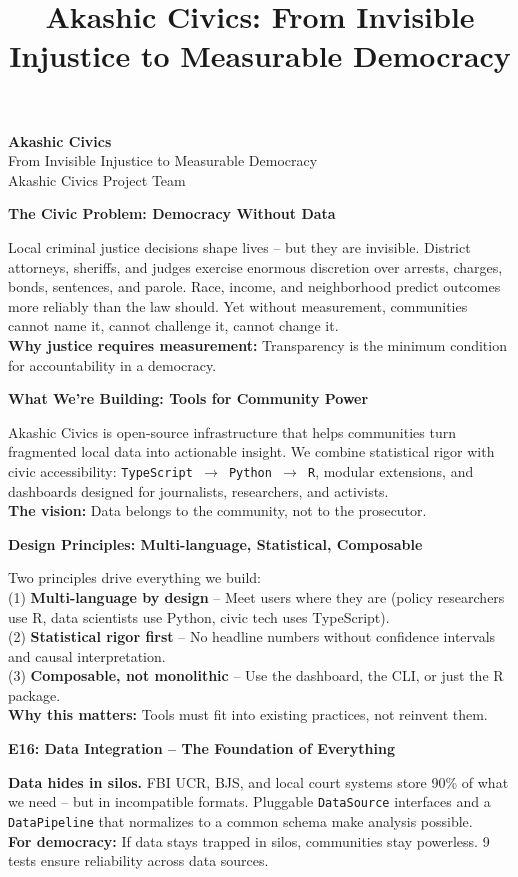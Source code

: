 \documentclass[11pt]{article}
\title{\Huge\textbf{Akashic Civics: From Invisible Injustice to Measurable Democracy}}
\date{}
\newcommand{\slide}[1]{\vspace{0.4em}\noindent\textbf{#1}\vspace{0.2em}}
\begin{document}
\begin{center} \Huge\textbf{Akashic Civics}\\[0.2em]
\LARGE{From Invisible Injustice to Measurable Democracy}\\[0.8em]
\large{Akashic Civics Project Team}
\end{center}

\slide{The Civic Problem: Democracy Without Data}

Local criminal justice decisions shape lives -- but they are invisible.  District attorneys, sheriffs, and judges exercise enormous discretion over arrests, charges, bonds, sentences, and parole.  Race, income, and neighborhood predict outcomes more reliably than the law should.  Yet without measurement, communities cannot name it, cannot challenge it, cannot change it.  \\
\textbf{Why justice requires measurement:} Transparency is the minimum condition for accountability in a democracy.

\slide{What We're Building: Tools for Community Power}

Akashic Civics is open-source infrastructure that helps communities turn fragmented local data into actionable insight.  We combine statistical rigor with civic accessibility: \texttt{TypeScript $\to$ Python $\to$ R}, modular extensions, and dashboards designed for journalists, researchers, and activists.  \\
\textbf{The vision:} Data belongs to the community, not to the prosecutor.

\slide{Design Principles: Multi-language, Statistical, Composable}

Two principles drive everything we build:\\
(1) \textbf{Multi-language by design} -- Meet users where they are (policy researchers use R, data scientists use Python, civic tech uses TypeScript).\\
(2) \textbf{Statistical rigor first} -- No headline numbers without confidence intervals and causal interpretation.\\
(3) \textbf{Composable, not monolithic} -- Use the dashboard, the CLI, or just the R package.\\
\textbf{Why this matters:} Tools must fit into existing practices, not reinvent them.

\slide{E16: Data Integration -- The Foundation of Everything}

\textbf{Data hides in silos.}  FBI UCR, BJS, and local court systems store 90\% of what we need -- but in incompatible formats.  Pluggable \texttt{DataSource} interfaces and a \texttt{DataPipeline} that normalizes to a common schema make analysis possible.  \\
\textbf{For democracy:} If data stays trapped in silos, communities stay powerless.  9 tests ensure reliability across data sources.
\end{document}
